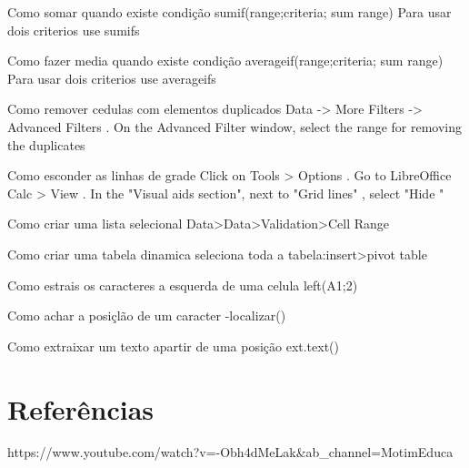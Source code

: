 Como somar quando existe condição
sumif(range;criteria; sum range)
Para usar dois criterios use sumifs

Como fazer media quando existe condição
averageif(range;criteria; sum range)
Para usar dois criterios use averageifs


Como remover cedulas com elementos duplicados
Data -> More Filters -> Advanced Filters . On the Advanced Filter window, select the range for removing the duplicates

Como esconder as linhas de grade
Click on Tools > Options . Go to LibreOffice Calc > View . In the "Visual aids section", next to "Grid lines" , select "Hide "


Como criar uma lista selecional
Data>Data>Validation>Cell Range

Como criar uma tabela dinamica
seleciona toda a tabela:insert>pivot table

Como estrais os caracteres a esquerda de uma celula
left(A1;2)

Como achar a posiçlão de um caracter
-localizar()

Como extraixar um texto apartir de uma posição
ext.text()


\chapter{Referências}
https://www.youtube.com/watch?v=-Obh4dMeLak&ab_channel=MotimEduca%
